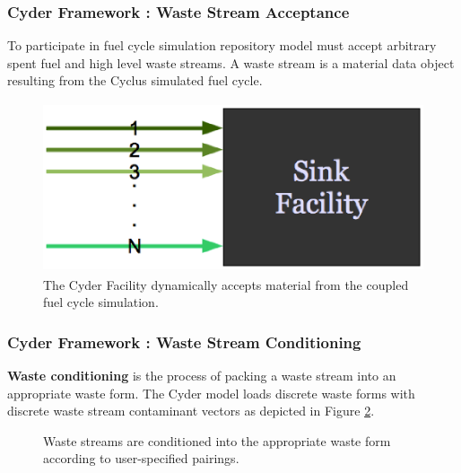 \begin{frame}[ctb!]
  \frametitle{Cyder Framework : Waste Stream Acceptance}
  \footnotesize{
  
To participate in fuel cycle simulation repository model must accept arbitrary 
spent fuel and high level waste streams. A waste stream is a material data 
object resulting from the Cyclus simulated fuel cycle.  
  \begin{figure}[htbp!]
    \begin{center}
      \includegraphics[height=5cm]{./cyder/images/sinkfacility.eps}
    \end{center}
    \caption{ The Cyder Facility dynamically accepts material from the 
    coupled fuel cycle simulation.} 
    \label{fig:sinkfacility}
  \end{figure}
}
\end{frame}

\begin{frame}[ctb!]
  \frametitle{Cyder Framework : Waste Stream Conditioning}
  \footnotesize{

    \textbf{Waste conditioning} is the process of packing a waste stream into an appropriate 
waste form.  The Cyder model loads discrete waste forms with discrete waste 
stream contaminant vectors as depicted in Figure \ref{fig:ws_conditioning}.
  
\begin{figure}[htbp!]
\begin{center}
\def\svgwidth{.5\textwidth}

\end{center}
\caption{Waste streams are conditioned into the appropriate waste form 
according to user-specified pairings.}
\label{fig:ws_conditioning}
\end{figure}
}
\end{frame}

